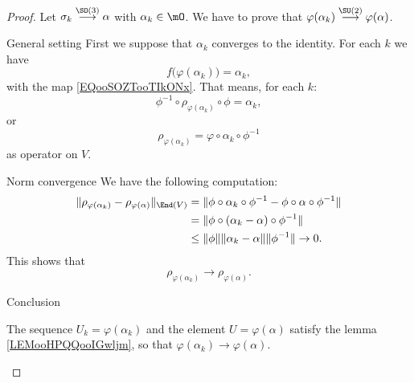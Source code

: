 \begin{proof}
    Let \( \sigma_k\stackrel{\SO(3)}{\longrightarrow} \alpha\) with \( \alpha_k\in \mO\). We have to prove that \( \varphi(\alpha_k)\stackrel{\SU(2)}{\longrightarrow}\varphi(\alpha)\).
    \begin{subproof}
        \item[General setting]
            First we suppose that \( \alpha_k\) converges to the identity. For each \( k\) we have
            \begin{equation}
                f\big( \varphi(\alpha_k) \big)=\alpha_k,
            \end{equation}
            with the map \eqref{EQooSOZTooTIkONx}. That means, for each \( k\):
            \begin{equation}
                \phi^{-1}\circ\rho_{\varphi(\alpha_k)}\circ \phi=\alpha_k,
            \end{equation}
            or
            \begin{equation}
                \rho_{\varphi(\alpha_k)}=\varphi\circ \alpha_k\circ\phi^{-1}
            \end{equation}
            as operator on \( V\).
        \item[Norm convergence]
            We have the following computation:
            \begin{subequations}
                \begin{align}
                    \| \rho_{\varphi(\alpha_k)}-\rho_{\varphi(\alpha)} \|_{\End(V)}&=\| \phi\circ\alpha_k\circ\phi^{-1}-\phi\circ\alpha\circ\phi^{-1} \|\\
                    &=\| \phi\circ(\alpha_k-\alpha)\circ\phi^{-1} \|\\
                    &\leq \| \phi \|\| \alpha_k-\alpha \|\| \phi^{-1} \|\to0.
                \end{align}
            \end{subequations}
            This shows that
            \begin{equation}        \label{EQooCEFUooTCoczi}
                \rho_{\varphi(\alpha_k)}\to \rho_{\varphi(\alpha)}.
            \end{equation}

        \item[Conclusion]

            The sequence \( U_k=\varphi(\alpha_k)\) and the element \( U=\varphi(\alpha)\) satisfy the lemma \ref{LEMooHPQQooIGwljm}, so that \( \varphi(\alpha_k)\to \varphi(\alpha)\).
    \end{subproof}
\end{proof}

